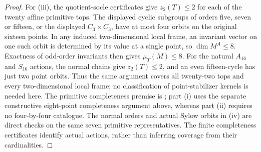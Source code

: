 \begin{proof}
For (iii), the quotient-socle certificates give $z_2(T)\leq2$
for each of the twenty affine primitive tops. The displayed cyclic
subgroups of orders five, seven or fifteen, or the displayed
$C_3\times C_3$, have at most four orbits on the original sixteen
points. In any induced two-dimensional local frame, an invariant
vector on one such orbit is determined by its value at a single
point, so $\dim M^A\leq8$. Exactness of odd-order invariants then
gives $\mu_T(M)\leq8$. For the natural $A_{16}$ and $S_{16}$
actions, the normal chains give $z_2(T)\leq2$, and an even
fifteen-cycle has just two point orbits. Thus the same argument
covers all twenty-two tops and every two-dimensional local frame;
no classification of point-stabilizer kernels is needed here.
The primitive completeness premise is
\cite{RoneyDougal2005Primitive,PrimGrp344}; part (i) uses the
separate constructive eight-point completeness argument above,
whereas part (ii) requires no four-by-four catalogue. The normal
orders and actual Sylow orbits in (iv) are direct checks on the
same seven primitive representatives. The finite completeness
certificates identify actual actions, rather than inferring
coverage from their cardinalities.
\end{proof}

